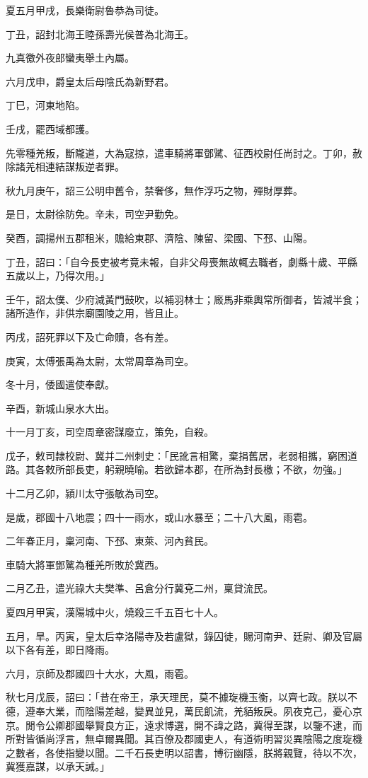 \begin{pinyinscope}
夏五月甲戌，長樂衛尉魯恭為司徒。

丁丑，詔封北海王睦孫壽光侯普為北海王。

九真徼外夜郎蠻夷舉土內屬。

六月戊申，爵皇太后母陰氏為新野君。

丁巳，河東地陷。

壬戌，罷西域都護。

先零種羌叛，斷隴道，大為寇掠，遣車騎將軍鄧騭、征西校尉任尚討之。丁卯，赦除諸羌相連結謀叛逆者罪。

秋九月庚午，詔三公明申舊令，禁奢侈，無作浮巧之物，殫財厚葬。

是日，太尉徐防免。辛未，司空尹勤免。

癸酉，調揚州五郡租米，贍給東郡、濟陰、陳留、梁國、下邳、山陽。

丁丑，詔曰：「自今長吏被考竟未報，自非父母喪無故輒去職者，劇縣十歲、平縣五歲以上，乃得次用。」

壬午，詔太僕、少府減黃門鼓吹，以補羽林士；廄馬非乘輿常所御者，皆減半食；諸所造作，非供宗廟園陵之用，皆且止。

丙戌，詔死罪以下及亡命贖，各有差。

庚寅，太傅張禹為太尉，太常周章為司空。

冬十月，倭國遣使奉獻。

辛酉，新城山泉水大出。

十一月丁亥，司空周章密謀廢立，策免，自殺。

戊子，敕司隸校尉、冀并二州刺史：「民訛言相驚，棄捐舊居，老弱相攜，窮困道路。其各敕所部長吏，躬親曉喻。若欲歸本郡，在所為封長檄；不欲，勿強。」

十二月乙卯，潁川太守張敏為司空。

是歲，郡國十八地震；四十一雨水，或山水暴至；二十八大風，雨雹。

二年春正月，稟河南、下邳、東萊、河內貧民。

車騎大將軍鄧騭為種羌所敗於冀西。

二月乙丑，遣光祿大夫樊準、呂倉分行冀兗二州，稟貸流民。

夏四月甲寅，漢陽城中火，燒殺三千五百七十人。

五月，旱。丙寅，皇太后幸洛陽寺及若盧獄，錄囚徒，賜河南尹、廷尉、卿及官屬以下各有差，即日降雨。

六月，京師及郡國四十大水，大風，雨雹。

秋七月戊辰，詔曰：「昔在帝王，承天理民，莫不據琁機玉衡，以齊七政。朕以不德，遵奉大業，而陰陽差越，變異並見，萬民飢流，羌貊叛戾。夙夜克己，憂心京京。閒令公卿郡國舉賢良方正，遠求博選，開不諱之路，冀得至謀，以鑒不逮，而所對皆循尚浮言，無卓爾異聞。其百僚及郡國吏人，有道術明習災異陰陽之度琁機之數者，各使指變以聞。二千石長吏明以詔書，博衍幽隱，朕將親覽，待以不次，冀獲嘉謀，以承天誡。」


\end{pinyinscope}
